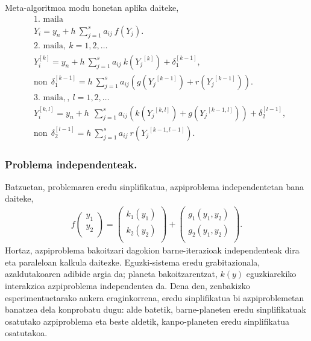 Meta-algoritmoa modu honetan aplika daiteke,
\begin{align*}
&\mbox{1. maila}\\ 
&Y_i=y_n+h \ \sum^s_{j=1}{a_{ij} \ f(Y_j)}.\\
&\mbox{2. maila}, \ k=1,2,\dots\\
&Y_i^{[k]}=y_n+h\  \sum^s_{j=1}{a_{ij} \ k({Y_j}^{[k]})}+ \delta_1^{[k-1]},\\
& \text{non} \ \ \delta_1^{[k-1]}= h\  \sum^s_{j=1}{a_{ij} (g({Y_j}^{[k-1]})+r({Y_j}^{[k-1]}))}. \\
&\mbox{3. maila}, , \ l=1,2,\dots\\
&Y_i^{[k,l]}=y_n+h\ \ \sum^s_{j=1}{a_{ij} \left(k({Y_j}^{[k,l]})+g({Y_j}^{[k-1,l]})\right)}+\delta_2^{[l-1]}, \\
& \text{non} \ \ \delta_2^{[l-1]}= h \ \sum^s_{j=1}{a_{ij} \ r({Y_j}^{[k-1,l-1]})}.
\end{align*}


\subsubsection*{Problema independenteak.}

Batzuetan, problemaren eredu sinplifikatua, azpiproblema independentetan bana daiteke,
\begin{align*}
f\left ( \begin{array}{c}
   y_1 \\
   y_2 \\
\end{array} \right)=
\left ( \begin{array}{c}
   k_1(y_1) \\
   k_2(y_2) \\
\end{array} \right)+
\left ( \begin{array}{c}
   g_1(y_1,y_2) \\
   g_2(y_1,y_2) \\
\end{array} \right).
\end{align*}
%
Hortaz, azpiproblema bakoitzari dagokion barne-iterazioak independenteak dira eta paraleloan kalkula daitezke. Eguzki-sistema eredu grabitazionala, azaldutakoaren adibide argia da; planeta bakoitzarentzat, $k(y)$ eguzkiarekiko interakzioa azpiproblema independentea da. Dena den, zenbakizko esperimentuetarako aukera eraginkorrena, eredu sinplifikatua bi azpiproblemetan banatzea dela konprobatu dugu: alde batetik, barne-planeten eredu sinplifikatuak osatutako azpiproblema eta beste aldetik, kanpo-planeten eredu sinplifikatua osatutakoa.    

